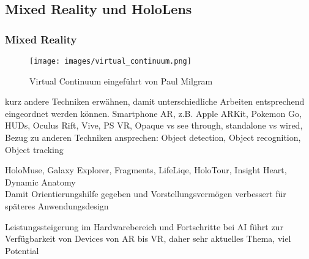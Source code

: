 \subsection{Mixed Reality und HoloLens}
\label{sec-2-1}

\subsubsection{Mixed Reality}
\label{sec-2-1-1}

\begin{figure}[h!]
	\centering
	\texttt{[image: images/virtual\_continuum.png]}
	\caption{Virtual Continuum eingeführt von Paul Milgram \cite{Milgram94}}
	\label{img:virtual_continuum}
\end{figure}

kurz andere Techniken erwähnen, damit unterschiedliche Arbeiten entsprechend eingeordnet werden können. Smartphone AR, z.B. Apple ARKit, Pokemon Go, HUDs, Oculus Rift, Vive, PS VR, Opaque vs see through, standalone vs wired, Bezug zu anderen Techniken ansprechen: Object detection, Object recognition, Object tracking

HoloMuse, Galaxy Explorer, Fragments, LifeLiqe, HoloTour, Insight Heart, Dynamic Anatomy\\
Damit Orientierungshilfe gegeben und Vorstellungsvermögen verbessert für späteres Anwendungsdesign

Leistungssteigerung im Hardwarebereich und Fortschritte bei AI führt zur Verfügbarkeit von Devices von AR bis VR, daher sehr aktuelles Thema, viel Potential

